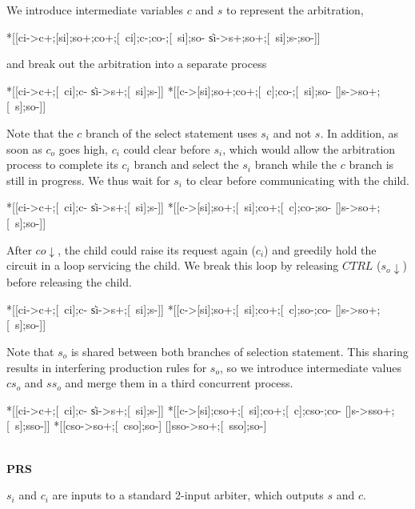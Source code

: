 \documentclass[aer.tex]{subfiles}
\begin{document}
\noindent We introduce intermediate variables $c$ and $s$ to represent the arbitration,

\begin{hse}
*[[ci->c+;[si];so+;co+;[~ci];c-;co-;[~si];so-
  \|si->s+;so+;[~si];s-;so-]]
\end{hse}

\noindent and break out the arbitration into a separate process

\begin{hse}
*[[ci->c+;[~ci];c-
  \|si->s+;[~si];s-]]
*[[c->[si];so+;co+;[~c];co-;[~si];so-
  []s->so+;[~s];so-]]
\end{hse}

\noindent Note that the $c$ branch of the select statement uses $s_i$ and not $s$. In addition, as soon as $c_o$ goes high, $c_i$ could clear before $s_i$, which would allow the arbitration process to complete its $c_i$ branch and select the $s_i$ branch while the $c$ branch is still in progress. We thus wait for $s_i$ to clear before communicating with the child.

\begin{hse}
*[[ci->c+;[~ci];c-
  \|si->s+;[~si];s-]]
*[[c->[si];so+;[~si];co+;[~c];co-;so-
  []s->so+;[~s];so-]]
\end{hse}

\noindent After $co\!\downarrow$, the child could raise its request again ($c_i$) and greedily hold the circuit in a loop servicing the child. We break this loop by releasing $CTRL$ ($s_o\!\downarrow$) before releasing the child.

\begin{hse}
*[[ci->c+;[~ci];c-
  \|si->s+;[~si];s-]]
*[[c->[si];so+;[~si];co+;[~c];so-;co-
  []s->so+;[~s];so-]]
\end{hse}

\noindent Note that $s_o$ is shared between both branches of selection statement. This sharing results in interfering production rules for $s_o$, so we introduce intermediate values $cs_o$ and $ss_o$ and merge them in a third concurrent process.

\begin{hse}
*[[ci->c+;[~ci];c-
  \|si->s+;[~si];s-]]\pll
*[[c->[si];cso+;[~si];co+;[~c];cso-;co-
  []s->sso+;[~s];sso-]]\pll
*[[cso->so+;[~cso];so-]
  []sso->so+;[~sso];so-]
\end{hse}

\noindent \\ \textbf{PRS}

\noindent $s_i$ and $c_i$ are inputs to a standard 2-input arbiter, which outputs $s$ and $c$.
\end{document}
